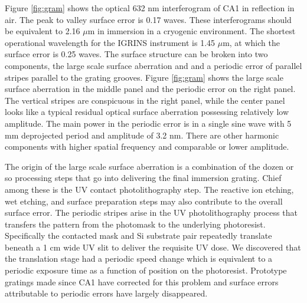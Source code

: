 \documentclass[]{spie}
\begin{document}
Figure \ref{fig:gram} shows the optical 632 nm interferogram of CA1 in reflection in air.  The peak to valley surface error is 0.17 waves.  These interferograms should be equivalent to 2.16 $\mu$m in immersion in a cryogenic environment.  The shortest operational wavelength for the IGRINS instrument is 1.45 $\mu$m, at which the surface error is 0.25 waves.  The surface structure can be broken into two components, the large scale surface aberration and and a periodic error of parallel stripes parallel to the grating grooves.  Figure \ref{fig:gram} shows the large scale surface aberration in the middle panel and the periodic error on the right panel.  The vertical stripes are conspicuous in the right panel, while the center panel looks like a typical residual optical surface aberration possessing relatively low amplitude.  The main power in the periodic error is in a single sine wave with 5 mm deprojected period and amplitude of 3.2 nm.  There are other harmonic components with higher spatial frequency and comparable or lower amplitude.  

The origin of the large scale surface aberration is a combination of the dozen or so processing steps that go into delivering the final immersion grating.  Chief among these is the UV contact photolithography step.  The reactive ion etching, wet etching, and surface preparation steps may also contribute to the overall surface error.  The periodic stripes arise in the UV photolithography process that transfers the pattern from the photomask to the underlying photoresist.  Specifically the contacted mask and Si substrate pair repeatedly translate beneath a 1 cm wide UV slit to deliver the requisite UV dose.  We discovered that the translation stage had a periodic speed change which is equivalent to a periodic exposure time as a function of position on the photoresist.  Prototype gratings made since CA1 have corrected for this problem and surface errors attributable to periodic errors have largely disappeared.  
\end{document}

